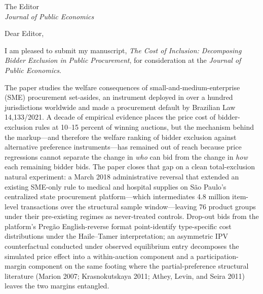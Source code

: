 \documentclass[11pt]{letter}
\begin{document}
\begin{letter}{The Editor\\\emph{Journal of Public Economics}}

\opening{Dear Editor,}

I am pleased to submit my manuscript, \emph{The Cost of Inclusion: Decomposing Bidder Exclusion in Public Procurement}, for consideration at the \emph{Journal of Public Economics}.

The paper studies the welfare consequences of small-and-medium-enterprise (SME) procurement set-asides, an instrument deployed in over a hundred jurisdictions worldwide and made a procurement default by Brazilian Law 14{,}133/2021. A decade of empirical evidence places the price cost of bidder-exclusion rules at 10--15 percent of winning auctions, but the mechanism behind the markup---and therefore the welfare ranking of bidder exclusion against alternative preference instruments---has remained out of reach because price regressions cannot separate the change in \emph{who} can bid from the change in \emph{how} each remaining bidder bids. The paper closes that gap on a clean total-exclusion natural experiment: a March 2018 administrative reversal that extended an existing SME-only rule to medical and hospital supplies on São Paulo's centralized state procurement platform---which intermediates 4.8 million item-level transactions over the structural sample window---leaving 76 product groups under their pre-existing regimes as never-treated controls. Drop-out bids from the platform's Pregão English-reverse format point-identify type-specific cost distributions under the Haile--Tamer interpretation; an asymmetric IPV counterfactual conducted under observed equilibrium entry decomposes the simulated price effect into a within-auction component and a participation-margin component on the same footing where the partial-preference structural literature (Marion 2007; Krasnokutskaya 2011; Athey, Levin, and Seira 2011) leaves the two margins entangled.


\end{letter}
\end{document}
